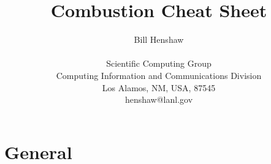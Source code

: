 \documentclass{article}
\begin{document}
 
\title{Combustion Cheat Sheet}

\author{
Bill Henshaw \\
\  \\
Scientific Computing Group \\
Computing Information and Communications Division\\
Los Alamos, NM, USA, 87545 \\
henshaw@lanl.gov }
 
\maketitle


\newcommand{\mbar}{\bar{m}}
\newcommand{\Rbar}{\bar{R}}
\newcommand{\Ru}{R_u}         %
\newcommand{\Div}{\grad\cdot}
\newcommand{\tauv}{\boldsymbol{\tau}}
\newcommand{\sigmav}{\boldsymbol{\sigma}}
\newcommand{\sumi}{\sum_{i=1}^n}

\tableofcontents

\section{General}
\end{document}
